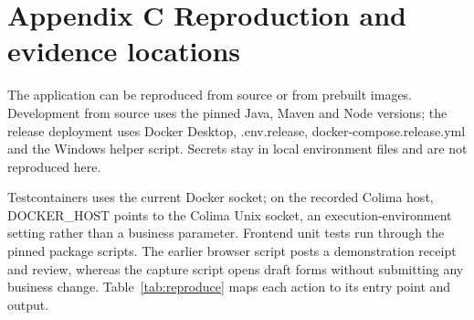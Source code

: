 \FloatBarrier

\section*{Appendix C Reproduction and evidence locations}


The application can be reproduced from source or from prebuilt images. Development from source uses the pinned Java, Maven and Node versions; the release deployment uses Docker Desktop, .env.release, docker-compose.release.yml and the Windows helper script. Secrets stay in local environment files and are not reproduced here.


Testcontainers uses the current Docker socket; on the recorded Colima host, DOCKER\_HOST points to the Colima Unix socket, an execution-environment setting rather than a business parameter. Frontend unit tests run through the pinned package scripts. The earlier browser script posts a demonstration receipt and review, whereas the capture script opens draft forms without submitting any business change. Table~\ref{tab:reproduce} maps each action to its entry point and output.


